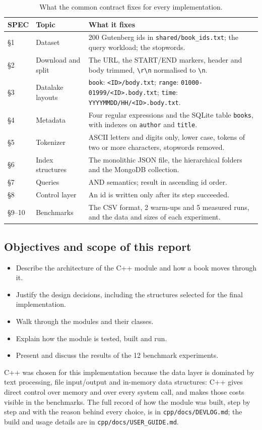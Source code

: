 \documentclass[11pt,a4paper]{article}
\newcommand{\code}[1]{\texttt{#1}}
\begin{document}
\begin{table}[H]
\centering\small
\begin{tabularx}{\linewidth}{@{}L{1.2cm} L{3.6cm} Y@{}}
\toprule
SPEC & Topic & What it fixes \\
\midrule
\S1 & Dataset & 200 Gutenberg ids in \code{shared/book\_ids.txt}; the query workload; the stopwords. \\
\S2 & Download and split & The URL, the START/END markers, header and body trimmed, \code{\textbackslash r\textbackslash n} normalised to \code{\textbackslash n}. \\
\S3 & Datalake layouts & \code{book}: \code{<ID>/body.txt}; \code{range}: \code{01000-01999/<ID>.body.txt}; \code{time}: \code{YYYYMMDD/HH/<ID>.body.txt}. \\
\S4 & Metadata & Four regular expressions and the SQLite table \code{books}, with indexes on \code{author} and \code{title}. \\
\S5 & Tokenizer & ASCII letters and digits only, lower case, tokens of two or more characters, stopwords removed. \\
\S6 & Index structures & The monolithic JSON file, the hierarchical folders and the MongoDB collection. \\
\S7 & Queries & AND semantics; result in ascending id order. \\
\S8 & Control layer & An id is written only after its step succeeded. \\
\S9--10 & Benchmarks & The CSV format, 2 warm-ups and 5 measured runs, and the data and sizes of each experiment. \\
\bottomrule
\end{tabularx}
\caption{What the common contract fixes for every implementation.}
\label{tab:spec}
\end{table}

\subsection{Objectives and scope of this report}
\begin{itemize}
  \item Describe the architecture of the C++ module and how a book moves through it.
  \item Justify the design decisions, including the structures selected for the final implementation.
  \item Walk through the modules and their classes.
  \item Explain how the module is tested, built and run.
  \item Present and discuss the results of the 12 benchmark experiments.
\end{itemize}
C++ was chosen for this implementation because the data layer is dominated by text processing, file
input/output and in-memory data structures: C++ gives direct control over memory and over every
system call, and makes those costs visible in the benchmarks. The full record of how the module was
built, step by step and with the reason behind every choice, is in \code{cpp/docs/DEVLOG.md}; the
build and usage details are in \code{cpp/docs/USER\_GUIDE.md}.
\end{document}
